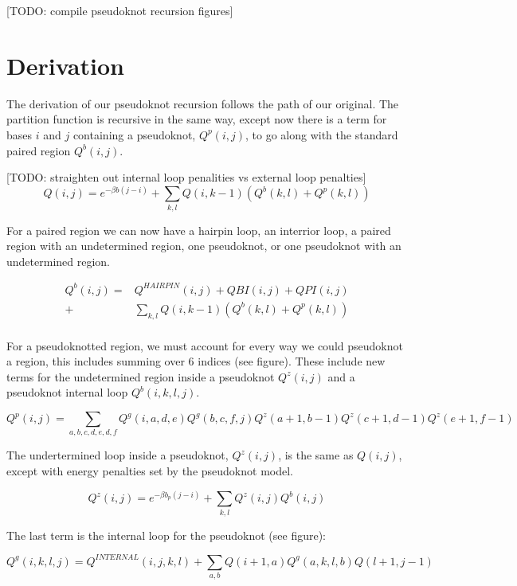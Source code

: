 [TODO: compile pseudoknot recursion figures]

\section{Derivation}

The derivation of our pseudoknot recursion follows the path of our
original. The partition function is recursive in the same way, except
now there is a term for bases $i$ and $j$ containing a pseudoknot,
$Q^p(i,j)$, to go along with the standard paired region $Q^b(i,j)$. 

[TODO: straighten out internal loop penalities vs external loop penalties]
\begin{equation}
Q(i,j) = e^{- \beta b (j - i)} + \sum_{k,l} Q(i, k-1) \left ( Q^b(k, l) + Q^p(k, l)  \right )
\end{equation}

For a paired region we can now have a hairpin loop, an interrior loop,
a paired region with an undetermined region, one pseudoknot, or one
pseudoknot with an undetermined region.

\begin{equation}
\begin{split}
Q^b(i,j) =& Q^{HAIRPIN}(i, j) + QBI(i, j)  + QPI(i, j)\\
 +& \sum_{k,l} Q(i, k-1)( Q^b(k, l) + Q^p(k, l) ) \\ 
\end{split}
\end{equation}

For a pseudoknotted region, we must account for every way we could
pseudoknot a region, this includes summing over 6 indices (see
figure). These include new terms for the undetermined region inside a
pseudoknot $Q^z(i,j)$ and a pseudoknot internal loop $Q^b(i, k, l, j)$.

\begin{equation}
Q^p(i, j) = \sum_{a,b,c,d,e,d,f} Q^g(i, a, d, e) Q^g(b, c, f, j)
Q^z(a+1, b-1) Q^z(c+1, d-1) Q^z(e+1, f-1)
\end{equation}

The undertermined loop inside a pseudoknot, $Q^z(i,j)$, is the same as
$Q(i,j)$, except with energy penalties set by the pseudoknot model. 

\begin{equation}
Q^z(i,j) = e ^{-\beta b_p (j-i)} + \sum_{k,l} Q^z(i,j) Q^b(i,j)
\end{equation}

The last term is the internal loop for the pseudoknot (see figure):

\begin{equation}
Q^g(i, k, l, j) = Q^{INTERNAL}(i,j,k,l) +  \sum_{a,b} Q(i+1, a) Q^g(a, k, l, b) Q(l+1, j -1) 
\end{equation}


